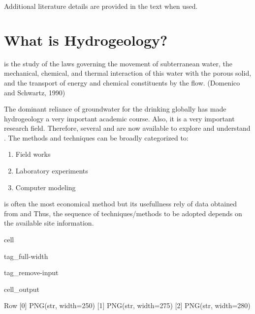 \documentclass[letterpaper,10pt,english]{jupyterBook}
\begin{document}
\sphinxAtStartPar
Additional literature details are provided in the text when used.


\section{What is Hydrogeology?}
\label{\detokenize{content/background/03_basic_hydrogeology:what-is-hydrogeology}}
\sphinxAtStartPar
{} is the study of the laws governing the movement of subterranean water, the mechanical, chemical, and thermal interaction of this water with the porous solid, and the transport of energy and chemical constituents by the flow.
(Domenico and Schwartz, 1990)

\sphinxAtStartPar
The dominant reliance of groundwater for the drinking globally has made hydrogeology a very important academic course. Also, it is a very important research field. Therefore, several  and  are now available to explore and understand . The methods and techniques can be broadly categorized to:
\begin{enumerate}
%
\item {} 
\sphinxAtStartPar
Field works

\item {} 
\sphinxAtStartPar
Laboratory experiments

\item {} 
\sphinxAtStartPar
Computer modeling

\end{enumerate}

\sphinxAtStartPar
{} is often the most economical method but its usefullness rely of data obtained from  and  Thus, the sequence of techniques/methods to be adopted depends on the available site information.

\begin{sphinxuseclass}{cell}
\begin{sphinxuseclass}{tag_full-width}
\begin{sphinxuseclass}{tag_remove-input}\begin{sphinxVerbatimOutput}

\begin{sphinxuseclass}{cell_output}
\begin{sphinxVerbatim}[commandchars=\\\{\}]
Row
    [0] PNG(str, width=250)
    [1] PNG(str, width=275)
    [2] PNG(str, width=280)
\end{sphinxVerbatim}

\end{sphinxuseclass}\end{sphinxVerbatimOutput}

\end{sphinxuseclass}
\end{sphinxuseclass}
\end{sphinxuseclass}
\end{document}
